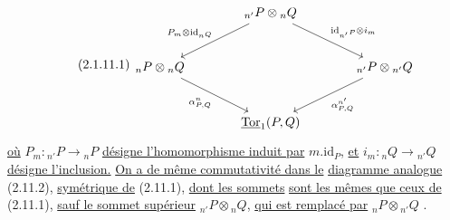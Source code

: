 \begin{equation}\tag{2.1.11.1}
\begin{tikzcd}[column sep=large, row sep=large]
 & {{}_{n'}P \otimes {}_{n}Q} \arrow[ld, "P_m \otimes \mathrm{id}_{{}_{n}Q}"'] \arrow[rd, "\mathrm{id}_{{}_{n'}P} \otimes i_m"] & \\
{{}_{n}P \otimes {}_{n}Q} \arrow[rd, "{\alpha^{n}_{P,Q}}"'] & & {{}_{n'}P \otimes {}_{n'}Q} \arrow[ld, "{\alpha^{n'}_{P,Q}}"] \\
 & {\underline{\mathrm{Tor}}_1(P,Q)} &
\end{tikzcd}
\end{equation}
\underline{où} $P_m : {}_{n'}P \longrightarrow {}_{n}P$ \underline{désigne l'homomorphisme induit par} $m.\mathrm{id}_P$, \underline{et} $i_m : {}_{n}Q \longrightarrow {}_{n'}Q$ \underline{désigne l'inclusion.} \underline{On a de même commutativité dans le} \underline{diagramme analogue} (2.11.2), \underline{symétrique de} (2.11.1), \underline{dont les sommets} \underline{sont les mêmes que ceux de} (2.11.1), \underline{sauf le sommet supérieur} ${}_{n'}P \otimes {}_{n}Q$, \underline{qui est remplacé par} ${}_{n}P \otimes {}_{n'}Q$ .

